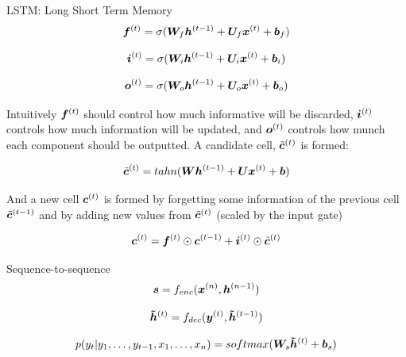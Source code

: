 \documentclass[10pt]{beamer}
\begin{document}
\begin{frame}{LSTM: Long Short Term Memory}
\begin{equation}
\bm{f}^{(t)} = \sigma(\bm{W}_{f} \bm{h}^{(t-1)} + \bm{U}_{f} \bm{x}^{(t)} + \bm{b}_{f})
\end{equation}

\begin{equation}
\bm{i}^{(t)} = \sigma(\bm{W}_{i} \bm{h}^{(t-1)} + \bm{U}_{i} \bm{x}^{(t)} + \bm{b}_{i})
\end{equation}

\begin{equation}
\bm{o}^{(t)} = \sigma(\bm{W}_{o} \bm{h}^{(t-1)} + \bm{U}_{o} \bm{x}^{(t)} + \bm{b}_{o})
\end{equation}

Intuitively $\bm{f}^{(t)}$ should control how much informative will be discarded, $\bm{i}^{(t)}$ controls how much information will be updated, and $\bm{o}^{(t)}$ controls how munch each component should be outputted. A candidate cell, $\tilde{\bm{c}}^{(t)}$ is formed:

\begin{equation}
\tilde{\bm{c}}^{(t)} = tahn(\bm{W} \bm{h}^{(t-1)} + \bm{U} \bm{x}^{(t)} + \bm{b})
\end{equation}

And a new cell $\bm{c}^{(t)}$ is formed by forgetting some information of the previous cell $\tilde{\bm{c}}^{(t-1)}$ and by adding new values from $\tilde{\bm{c}}^{(t)}$ (scaled by the input gate)

\begin{equation}
\bm{c}^{(t)} = \bm{f}^{(t)} \odot \bm{c}^{(t-1)} + \bm{i}^{(t)} \odot \tilde{\bm{c}}^{(t)}
\end{equation}
\end{frame}

\begin{frame}{Sequence-to-sequence}
\begin{equation}
\bm{s} = f_{enc}(\bm{x}^{(n)}, \bm{h}^{(n-1)})
\end{equation}

\begin{equation}
\bm{\tilde{h}}^{(t)} = f_{dec}(\bm{y}^{(t)}, \bm{\tilde{h}}^{(t-1)})
\end{equation}

\begin{equation}
p(y_t | y_1, \dots, y_{t-1}, x_1, \dots, x_{n}) = softmax(\bm{W}_{s}  \bm{\tilde{h}}^{(t)} + \bm{b}_s)
\end{equation}


\end{frame}
\end{document}
